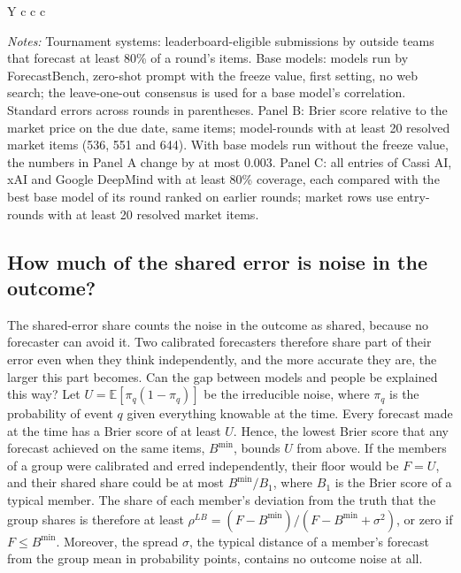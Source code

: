 \documentclass[11pt,a4paper]{article}
\theoremstyle{definition}
\begin{document}
\begin{table}[t]
\begin{threeparttable}
\begin{tabularx}{\textwidth}{Y c c c}
\bottomrule
\end{tabularx}
\begin{tablenotes}\footnotesize
\item \emph{Notes:} Tournament systems: leaderboard-eligible submissions by outside teams that forecast at least 80\% of a round's items. Base models: models run by ForecastBench, zero-shot prompt with the freeze value, first setting, no web search; the leave-one-out consensus is used for a base model's correlation. Standard errors across rounds in parentheses. Panel B: Brier score relative to the market price on the due date, same items; model-rounds with at least 20 resolved market items (536, 551 and 644). With base models run without the freeze value, the numbers in Panel A change by at most 0.003. Panel C: all entries of Cassi AI, xAI and Google DeepMind with at least 80\% coverage, each compared with the best base model of its round ranked on earlier rounds; market rows use entry-rounds with at least 20 resolved market items.
\end{tablenotes}
\end{threeparttable}
\end{table}

\subsection{How much of the shared error is noise in the outcome?}\label{sec:noise}

The shared-error share counts the noise in the outcome as shared, because no forecaster can avoid it. Two calibrated forecasters therefore share part of their error even when they think independently, and the more accurate they are, the larger this part becomes. Can the gap between models and people be explained this way? Let $U=\mathbb{E}[\pi_q(1-\pi_q)]$ be the irreducible noise, where $\pi_q$ is the probability of event $q$ given everything knowable at the time. Every forecast made at the time has a Brier score of at least $U$. Hence, the lowest Brier score that any forecast achieved on the same items, $B^{\min}$, bounds $U$ from above. If the members of a group were calibrated and erred independently, their floor would be $F=U$, and their shared share could be at most $B^{\min}/B_1$, where $B_1$ is the Brier score of a typical member. The share of each member's deviation from the truth that the group shares is therefore at least $\rho^{LB}=(F-B^{\min})/(F-B^{\min}+\sigma^2)$, or zero if $F\le B^{\min}$. Moreover, the spread $\sigma$, the typical distance of a member's forecast from the group mean in probability points, contains no outcome noise at all.
\end{document}
